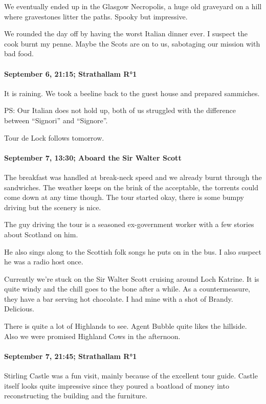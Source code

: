 We eventually ended up in the Glasgow Necropolis, a huge old graveyard on a hill where gravestones litter the paths.
Spooky but impressive.

We rounded the day off by having the worst Italian dinner ever.
I suspect the cook burnt my penne.
Maybe the Scots are on to us, sabotaging our mission with bad food.

\paragraph{September 6, 21:15; Strathallam R°1}
It is raining.
We took a beeline back to the guest house and prepared sammiches.

PS: Our Italian does not hold up, both of us struggled with the difference between "`Signori"' and "`Signore"'.

Tour de Lock follows tomorrow.

\paragraph{September 7, 13:30; Aboard the Sir Walter Scott}
The breakfast was handled at break-neck speed and we already burnt through the sandwiches.
The weather keeps on the brink of the acceptable, the torrents could come down at any time though.
The tour started okay, there is some bumpy driving but the scenery is nice.

The guy driving the tour is a seasoned ex-government worker with a few stories about Scotland on him.

He also sings along to the Scottish folk songs he puts on in the bus.
I also suspect he was a radio host once.

Currently we're stuck on the Sir Walter Scott cruising around Loch Katrine.
It is quite windy and the chill goes to the bone after a while.
As a countermeasure, they have a bar serving hot chocolate.
I had mine with a shot of Brandy.
Delicious.

There is quite a lot of Highlands to see.
Agent Bubble quite likes the hillside.
Also we were promised Highland Cows in the afternoon.

\paragraph{September 7, 21:45; Strathallam R°1}
Stirling Castle was a fun visit, mainly because of the excellent tour guide.
Castle itself looks quite impressive since they poured a boatload of money into reconstructing the building and the furniture.

